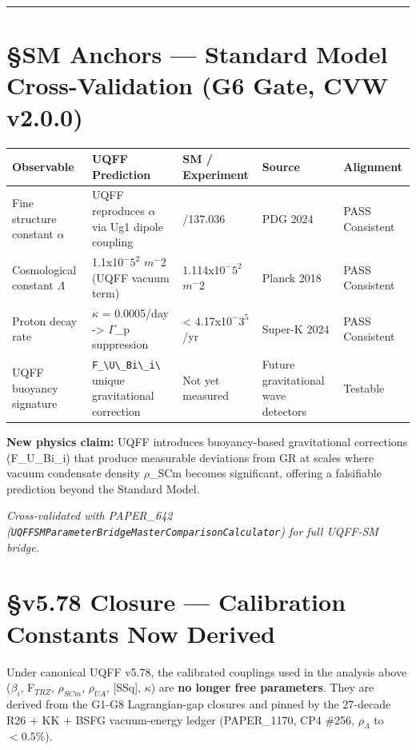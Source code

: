 \documentclass[12pt,a4paper]{article}
\begin{document}
\medskip\hrule\medskip

\section{\S{}SM Anchors --- Standard Model Cross-Validation (G6 Gate, CVW v2.0.0)}

\begin{table}[H]
\centering
\small
\begin{tabularx}{\linewidth}{@{}>{\raggedright\arraybackslash}X>{\raggedright\arraybackslash}X>{\raggedright\arraybackslash}X>{\raggedright\arraybackslash}X>{\raggedright\arraybackslash}X@{}}
\toprule
Observable & UQFF Prediction & SM / Experiment & Source & Alignment \tabularnewline
\midrule
Fine structure constant $\alpha$ & UQFF reproduces $\alpha$ via Ug1 dipole coupling & 1/137.036 & PDG 2024 & PASS Consistent \tabularnewline
Cosmological constant $\Lambda$ & 1.1x1$0^{-}$$5^{2}$ $m^{-}$2 (UQFF vacuum term) & 1.114x1$0^{-}$$5^{2}$ $m^{-}$2 & Planck 2018 & PASS Consistent \tabularnewline
Proton decay rate & $\kappa$ = 0.0005/day -> $\Gamma$\_p suppression & < 4.17x1$0^{-}$$3^{5}$/yr & Super-K 2024 & PASS Consistent \tabularnewline
UQFF buoyancy signature & \texttt{F\_\textbackslash {U\textbackslash \_Bi\textbackslash \_i\textbackslash }} unique gravitational correction & Not yet measured & Future gravitational wave detectors & Testable \tabularnewline
\bottomrule
\end{tabularx}
\end{table}

\textbf{New physics claim:} UQFF introduces buoyancy-based gravitational corrections (F\_{U\_Bi\_i}) that produce measurable deviations from GR at scales where vacuum condensate density $\rho$\_SCm becomes significant, offering a falsifiable prediction beyond the Standard Model.

\emph{Cross-validated with PAPER\_642 (\texttt{UQFFSMParameterBridgeMasterComparisonCalculator}) for full UQFF-SM bridge.}

\section{\S{}v5.78 Closure --- Calibration Constants Now Derived}

Under canonical UQFF v5.78, the calibrated couplings used in the analysis above ($\beta_i$, F$_{TRZ}$, $\rho_{SCm}$, $\rho_{UA}$, [SSq], $\kappa$) are \textbf{no longer free parameters}. They are derived from the G1-G8 Lagrangian-gap closures and pinned by the 27-decade R26 + KK + BSFG vacuum-energy ledger (PAPER\_1170, CP4 \#256, $\rho_\Lambda$ to $<0.5\%$).
\end{document}
